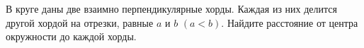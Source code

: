 \begin{ex}
	\begin{condition}
		В круге даны две взаимно перпендикулярные хорды. Каждая из них делится другой хордой на отрезки, равные \( a  \) и \(  b  \) \( (a < b) \). Найдите расстояние от центра окружности до каждой хорды.
	\end{condition}
\end{ex}
